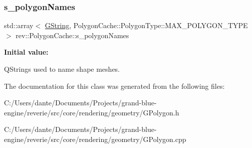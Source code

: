 \subsubsection{\texorpdfstring{s\_polygonNames}{s\_polygonNames}}
{\footnotesize\ttfamily std\+::array$<$ \mbox{\hyperlink{classrev_1_1_g_string}{G\+String}}, Polygon\+Cache\+::\+Polygon\+Type\+::\+M\+A\+X\+\_\+\+P\+O\+L\+Y\+G\+O\+N\+\_\+\+T\+Y\+PE $>$ rev\+::\+Polygon\+Cache\+::s\+\_\+polygon\+Names\hspace{0.3cm}{\ttfamily [static]}}

{\bfseries Initial value\+:}
\begin{DoxyCode}{0}
\DoxyCodeLine{\{ \{}
\DoxyCodeLine{    \textcolor{stringliteral}{"rectangle"},}
\DoxyCodeLine{    \textcolor{stringliteral}{"cube"},}
\DoxyCodeLine{    \textcolor{stringliteral}{"latlonsphere"},}
\DoxyCodeLine{    \textcolor{stringliteral}{"gridplane"},}
\DoxyCodeLine{    \textcolor{stringliteral}{"gridcube"},}
\DoxyCodeLine{    \textcolor{stringliteral}{"cylinder"},}
\DoxyCodeLine{    \textcolor{stringliteral}{"capsule"}}
\DoxyCodeLine{\} \}}

\end{DoxyCode}


Q\+Strings used to name shape meshes. 



The documentation for this class was generated from the following files\+:\begin{DoxyCompactItemize}
\item 
C\+:/\+Users/dante/\+Documents/\+Projects/grand-\/blue-\/engine/reverie/src/core/rendering/geometry/G\+Polygon.\+h\item 
C\+:/\+Users/dante/\+Documents/\+Projects/grand-\/blue-\/engine/reverie/src/core/rendering/geometry/G\+Polygon.\+cpp\end{DoxyCompactItemize}
